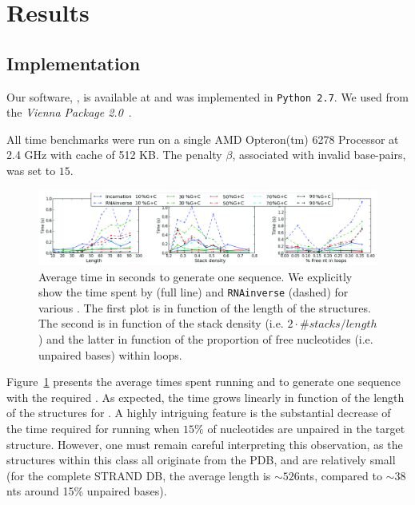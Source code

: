 \section{Results}
\label{sec:results}

\subsection{Implementation}
\label{sec:implementation}
Our software, \ourprog, is available at \oururl and was implemented in {\tt Python~2.7}. We used
\RNAinverse from the \textit{Vienna Package 2.0}~\cite{Hofacker:1994}.

All time benchmarks were run on a single AMD Opteron(tm) 6278 Processor  at 2.4 GHz with cache of 512 KB.
The penalty $\beta$, associated with invalid base-pairs, was set to $15$.

\begin{figure}[t!]
	\centering
 	\includegraphics[width=\textwidth]{Figures/time_rnastrand_clustered_rnainverse_100samples_fix}
	\caption{Average time in seconds to generate one sequence. We explicitly show 
	the time spent by \ourprog (full line) and \texttt{RNAinverse} (dashed) for various \GCContent. The first plot is in function
	of the length of the structures. The second is in function of the stack
	density (i.e. $2\cdot\#stacks/length$) and the latter in function of 
	the proportion of free nucleotides (i.e. unpaired bases) within loops.}
	\label{fig:time}	
\end{figure}

Figure~\ref{fig:time} presents the average times spent running \ourprog and \RNAinverse to generate one sequence
with the required \GCContent. As expected, the time grows linearly
in function of the length of the structures for \ourprog.  A highly intriguing feature is the substantial decrease of the time 
required for running \RNAinverse when $15\%$ of nucleotides are unpaired in the target structure.
However, one must remain careful interpreting this observation, as the structures within this class all originate from the PDB, and are relatively small (for the complete STRAND DB, the average length is $\sim526$nts, compared to $\sim38$nts around 15\% unpaired bases).



